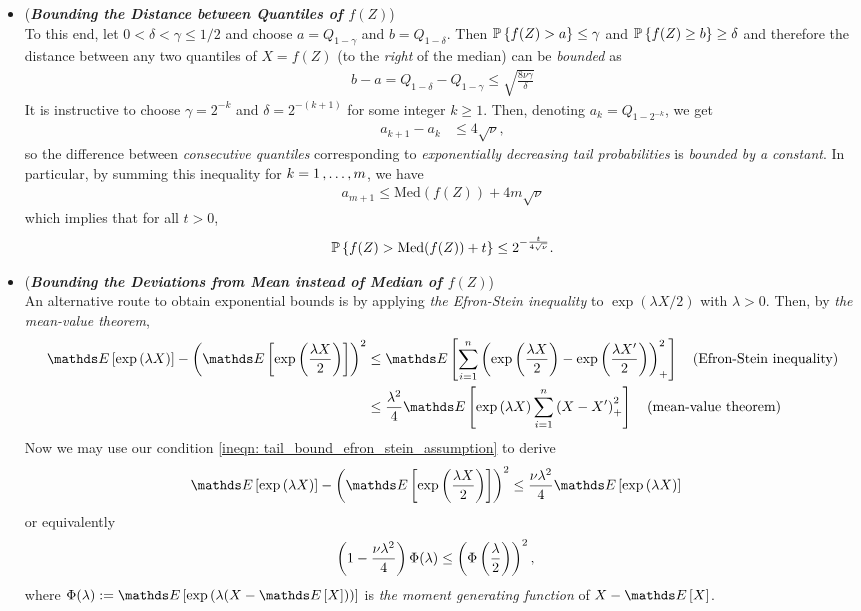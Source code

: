 \documentclass[11pt]{article}
\begin{document}
\begin{itemize}
\item \begin{remark} (\textbf{\emph{Bounding the Distance between Quantiles of $f(Z)$}})\\
To this end, let $0 < \delta < \gamma \le 1/2$ and choose $a = Q_{1-\gamma}$ and $b = Q_{1-\delta}$. Then ${\mathbb P}\left\{f(Z) > a\right\} \le \gamma$ and
${\mathbb P}\left\{f(Z) \ge b\right\} \ge \delta$ and therefore the distance between any two quantiles of $X =f(Z)$ (to the \emph{right} of the median) can be \emph{bounded} as
\begin{align*}
b -a = Q_{1-\delta} - Q_{1-\gamma} \le \sqrt{\frac{8 \nu \gamma}{\delta}}
\end{align*}
It is instructive to choose $\gamma = 2^{-k}$ and $\delta = 2^{-(k+1)}$ for some integer $k \ge 1$. Then, denoting $a_k = Q_{1 - 2^{-k}}$, we get
\begin{align*}
a_{k+1} - a_k &\le 4 \sqrt{\nu},
\end{align*}
so the difference between \emph{consecutive quantiles} corresponding to \emph{exponentially decreasing tail probabilities} is \emph{bounded by a constant}. In particular, by summing this inequality for $k = 1 \,{,}\ldots{,}\, m$, we have
\begin{align*}
a_{m+1} \le \text{Med}(f(Z)) + 4m\sqrt{\nu}
\end{align*} which implies that for all $t > 0$,
\begin{align}
{\mathbb P}\left\{f(Z) > \text{Med}(f(Z)) + t\right\} \le 2^{-\frac{t}{4\sqrt{\nu}}}. \label{ineqn: tail_bound_efron_stein}
\end{align}
\end{remark}

\item \begin{remark} (\textbf{\emph{Bounding the Deviations from Mean instead of Median of $f(Z)$}})\\
An alternative route to obtain exponential bounds is by applying \emph{the Efron-Stein inequality} to $\exp(\lambda X/2)$ with $\lambda > 0$. Then, by \emph{the mean-value theorem}, 
\begin{align*}
\E{}{\exp\paren{\lambda X}} - \paren{\E{}{\exp\paren{\frac{\lambda X}{2}}}}^2 &\le \E{}{\sum_{i=1}^{n}\paren{\exp\paren{\frac{\lambda X}{2}} - \exp\paren{\frac{\lambda X'}{2}}}_{+}^2} \quad (\text{Efron-Stein inequality})\\
&\le \frac{\lambda^2}{4} \E{}{\exp\paren{\lambda X}\sum_{i=1}^{n}\paren{X -  X'}_{+}^2} \quad (\text{mean-value theorem})
\end{align*} Now we may use our condition \eqref{ineqn: tail_bound_efron_stein_assumption} to derive
\begin{align*}
\E{}{\exp\paren{\lambda X}} - \paren{\E{}{\exp\paren{\frac{\lambda X}{2}}}}^2 &\le  \frac{\nu \lambda^2}{4}\E{}{\exp\paren{\lambda X}}
\end{align*} or equivalently
\begin{align*}
\left(1-\frac{\nu \lambda^2}{4}\right)\Phi(\lambda) &\le \left(\Phi\left(\frac{\lambda}{2}\right)\right)^2,
\end{align*} where $\Phi(\lambda):= \E{}{\exp\paren{\lambda (X - \E{}{X})}}$ is \emph{the moment generating function} of $X- \E{}{X}$.


\end{remark}
\end{itemize}
\end{document}
